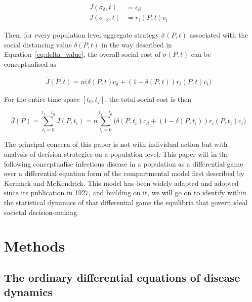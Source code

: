 \documentclass[12pt]{article}
\begin{document}
\begin{equation}
	\begin{aligned}
		J(\sigma_{\delta}, t) & = c_d 									\\
		J(\sigma_{\lnot \delta}, t) & = r_i(P, t) c_i
	\end{aligned}
	\label{eq:pure_time_dependent_costs}
\end{equation}

Then, for every population level aggregate strategy $\bar{\sigma}(P, t)$ associated with the social distancing value $\delta(P, t)$ in the way described in Equation~\eqref{eq:delta_value}, the overall social cost of $\bar{\sigma}(P, t)$ can be conceptualised as

\begin{equation}
	\begin{aligned}
		\bar{J}(P, t) = n \Big( \delta(P, t) c_d + (1-\delta(P, t)) r_i(P, t) c_i \Big)
	\end{aligned}
	\label{eq:social_time_dependent_costs}
\end{equation}

For the entire time space $[t_0, t_f]$, the total social cost is then

\begin{equation}
	\bar{\bar{J}}(P) = \sum_{t_i = 0}^{t_f - t_0} J(P, t_i) = n \sum_{t_i = 0}^{t_f - t_0} \Big( \delta(P, t_i) c_d + (1 - \delta(P, t_i)) r_i(P, t_i) c_i \Big)
\end{equation}

The principal concern of this paper is not with individual action but with analysis of decision strategies on a population level. This paper will in the following conceptualise infectious disease in a population as a differential game over a differential equation form of the compartmental model first described by Kermack and McKendrick\cite{kermack1927contribution}. This model has been widely adapted and adopted since its publication in 1927,\cite{vstvepan2007kermack,roberts1999kermack,capasso1978generalization} and building on it, we will go on to identify within the statistical dynamics of that differential game the equilibria that govern ideal societal decision-making.


\section{Methods} %
\label{sec:methods}

\subsection{The ordinary differential equations of disease dynamics} %
\label{sub:the_ordinary_differential_equations_of_disease_dynamics}
\end{document}
